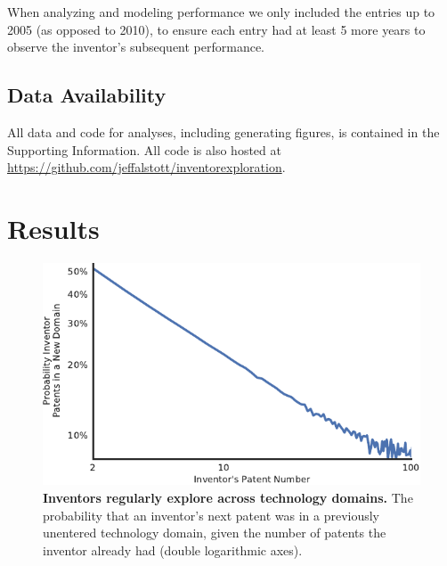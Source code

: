 \documentclass{dsj}
\begin{document}
When analyzing and modeling performance we only included the entries up to 2005 (as opposed to 2010), to ensure each entry had at least 5 more years to observe the inventor's subsequent performance.

\subsection*{Data Availability}
All data and code for analyses, including generating figures, is contained in the Supporting Information. All code is also hosted at \url{https://github.com/jeffalstott/inventorexploration}.

\section*{Results}

\begin{figure}
\begin{center}
\includegraphics[width=\textwidth]{figs/movement_frequency.pdf} 
\end{center}
\caption{\textbf{Inventors regularly explore across technology domains.} The probability that an inventor's next patent was in a previously unentered technology domain, given the number of patents the inventor already had (double logarithmic axes).
}
\label{movement_frequency}
\end{figure}
\end{document}
